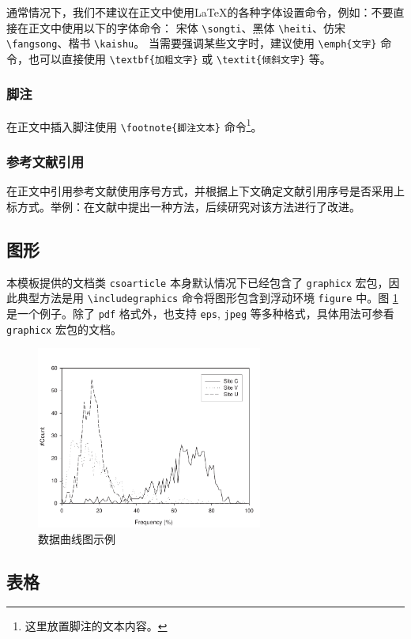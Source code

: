 \documentclass[UTF8]{csoarticle}
\begin{document}
通常情况下，我们不建议在正文中使用\LaTeX{}的各种字体设置命令，例如：不要直接在正文中使用以下的字体命令：
宋体 \verb|\songti|、黑体 \verb|\heiti|、仿宋 \verb|\fangsong|、楷书 \verb|\kaishu|。
当需要强调某些文字时，建议使用 \verb|\emph{文字}| 命令，也可以直接使用 \verb|\textbf{加粗文字}| 或 \verb|\textit{倾斜文字}| 等。

\subsubsection{脚注}

在正文中插入脚注使用 \verb|\footnote{脚注文本}| 命令\footnote{这里放置脚注的文本内容。}。

\subsubsection{参考文献引用}

在正文中引用参考文献使用序号方式，并根据上下文确定文献引用序号是否采用上标方式。举例：在文献\cite{bib1}中提出一种方法，后续研究对该方法进行了改进。

\subsection{图形}

本模板提供的文档类 \verb|csoarticle| 本身默认情况下已经包含了 \verb|graphicx| 宏包，因此典型方法是用 \verb|\includegraphics| 命令将图形包含到浮动环境 \verb|figure| 中。图 \ref{fig:sample} 是一个例子。除了 \verb|pdf| 格式外，也支持 \verb|eps|, \verb|jpeg| 等多种格式，具体用法可参看 \verb|graphicx| 宏包的文档。
\begin{figure}
\centering\includegraphics[height=6cm]{figsamp}
\caption{数据曲线图示例}
\label{fig:sample}
\end{figure}

\subsection{表格}
\end{document}
